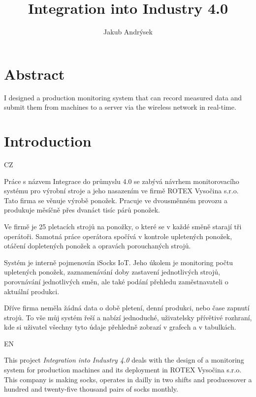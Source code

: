 \documentclass[12pt, a4paper]{article}
\title{Integration into Industry 4.0}
\author{Jakub Andrýsek}
\date{}
\begin{document}

\maketitle

\section*{Abstract}
I designed a production monitoring system that can record measured data and submit them from machines to a server via the wireless network in real-time.



\section*{Introduction}

CZ

Práce s názvem Integrace do průmyslu 4.0 se zabývá návrhem monitorovacího systému pro výrobní stroje a jeho nasazením ve firmě ROTEX Vysočina s.r.o.
Tato firma se věnuje výrobě ponožek.
Pracuje ve dvousměnném provozu a produkuje měsíčně přes dvanáct tisíc párů ponožek.

Ve firmě je 25 pletacích strojů na ponožky, o které se v každé směně starají tři operátoři.
Samotná práce operátora spočívá v kontrole upletených ponožek, otáčení dopletených ponožek a opravách porouchaných strojů.

Systém je interně pojmenován iSocks IoT.
Jeho úkolem je monitoring počtu upletených ponožek, zaznamenávání doby zastavení jednotlivých strojů, porovnávání jednotlivých směn, ale také podání přehledu zaměstnavateli o aktuální produkci.

Dříve firma neměla žádná data o době pletení, denní  produkci, nebo čase zapnutí strojů.
To vše  můj systém řeší  a nabízí jednoduché, uživatelsky přívětivé rozhraní, kde si uživatel všechny tyto údaje přehledně zobrazí v grafech a v tabulkách.

EN

This project \emph{Integration into Industry 4.0} deals with the design of a monitoring system for production machines and its deployment in ROTEX Vysočina s.r.o.
This company is making socks, operates in dailly in two shifts and producesover a hundred and twenty-five thousand pairs of socks monthly.
\end{document}
